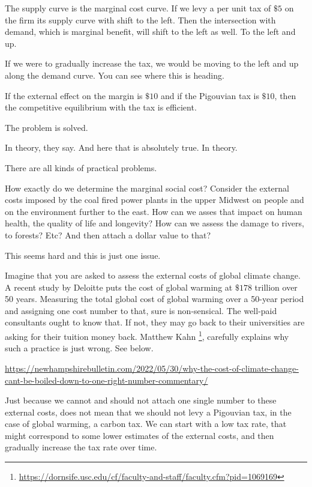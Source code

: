 \documentclass[
]{book}
\begin{document}
The supply curve is the marginal cost curve. If we levy a per unit tax of \(\$5\) on the firm its supply curve with shift to the left. Then the intersection with demand, which is marginal benefit, will shift to the left as well. To the left and up.

If we were to gradually increase the tax, we would be moving to the left and up along the demand curve. You can see where this is heading.

If the external effect on the margin is \(\$10\) and if the Pigouvian tax is \(\$10\), then the competitive equilibrium with the tax is efficient.

The problem is solved.

In theory, they say. And here that is absolutely true. In theory.

There are all kinds of practical problems.

How exactly do we determine the marginal social cost? Consider the external costs imposed by the coal fired power plants in the upper Midwest on people and on the environment further to the east. How can we asses that impact on human health, the quality of life and longevity? How can we assess the damage to rivers, to forests? Etc? And then attach a dollar value to that?

This seems hard and this is just one issue.

Imagine that you are asked to assess the external costs of global climate change. A recent study by Deloitte puts the cost of global warming at \(\$178\) trillion over 50 years. Measuring the total global cost of global warming over a 50-year period and assigning one cost number to that, sure is non-sensical. The well-paid consultants ought to know that. If not, they may go back to their universities are asking for their tuition money back. Matthew Kahn \footnote{\url{https://dornsife.usc.edu/cf/faculty-and-staff/faculty.cfm?pid=1069169}}, carefully explains why such a practice is just wrong. See below.

\url{https://newhampshirebulletin.com/2022/05/30/why-the-cost-of-climate-change-cant-be-boiled-down-to-one-right-number-commentary/}

Just because we cannot and should not attach one single number to these external costs, does not mean that we should not levy a Pigouvian tax, in the case of global warming, a carbon tax. We can start with a low tax rate, that might correspond to some lower estimates of the external costs, and then gradually increase the tax rate over time.
\end{document}

